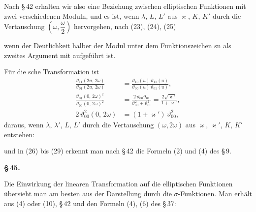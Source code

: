 

Nach \S\,42 erhalten wir also eine Beziehung zwischen elliptischen Funktionen mit zwei verschiedenen Moduln, und es ist, wenn $\lambda$, $L$, $L'$ aus $\varkappa$, $K$, $K'$ durch die Vertauschung $\left(\omega,\dfrac{\omega}{2}\right)$ hervorgehen, nach (23), (24), (25)



wenn der Deutlichkeit halber der Modul unter dem Funktionszeichen sn als zweites Argument mit aufgeführt ist.

Für die sche Transformation ist
\[
\begin{aligned}
\frac{\vartheta_{11}(2u,\,2\omega)}{\vartheta_{01}(2u,\,2\omega)}&=\frac{\vartheta_{10}(u)\,\vartheta_{11}(u)}{\vartheta_{00}(u)\,\vartheta_{01}(u)},\\[4pt]
\frac{\vartheta_{01}(0,\,2\omega)^{2}}{\vartheta_{00}(0,\,2\omega)^{2}}&=\frac{2\,\vartheta_{00}\vartheta_{01}}{\vartheta_{00}^{2}+\vartheta_{01}^{2}}=\frac{2\sqrt{\varkappa'}}{1+\varkappa'},\\[4pt]
2\,\vartheta_{00}^{2}(0,\,2\omega)&=(1+\varkappa')\,\vartheta_{00}^{2},
\end{aligned}
\]
daraus, wenn $\lambda$, $\lambda'$, $L$, $L'$ durch die Vertauschung $(\omega,2\omega)$ aus $\varkappa$, $\varkappa'$, $K$, $K'$ entstehen:



und in (26) bis (29) erkennt man nach \S\,42 die Formeln (2) und (4) des \S\,9.

\begin{center}
\textbf{\S\,45. }
\end{center}

Die Einwirkung der linearen Transformation auf die elliptischen Funktionen übersieht man am besten aus der Darstellung durch die $\sigma$-Funktionen. Man erhält aus (4) oder (10), \S\,42 und den Formeln (4), (6) des \S\,37:
